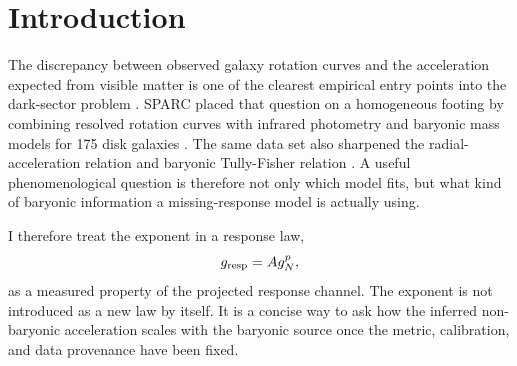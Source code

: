 ﻿\documentclass[twocolumn]{aastex631}
\begin{document}
\section{Introduction}
The discrepancy between observed galaxy rotation curves and the acceleration expected from visible matter is one of the clearest empirical entry points into the dark-sector problem \citep{Rubin1970,Rubin1980,Bosma1981,Begeman1991,SofueRubin2001}.  SPARC placed that question on a homogeneous footing by combining resolved rotation curves with infrared photometry and baryonic mass models for 175 disk galaxies \citep{Lelli2016SPARC}.  The same data set also sharpened the radial-acceleration relation and baryonic Tully-Fisher relation \citep{McGaugh2016RAR,Lelli2017BTFR,McGaugh2012}.  A useful phenomenological question is therefore not only which model fits, but what kind of baryonic information a missing-response model is actually using.

I therefore treat the exponent in a response law,
\begin{equation}
g_{\rm resp}=A g_N^p ,
\end{equation}
as a measured property of the projected response channel.  The exponent is not introduced as a new law by itself.  It is a concise way to ask how the inferred non-baryonic acceleration scales with the baryonic source once the metric, calibration, and data provenance have been fixed.
\end{document}
